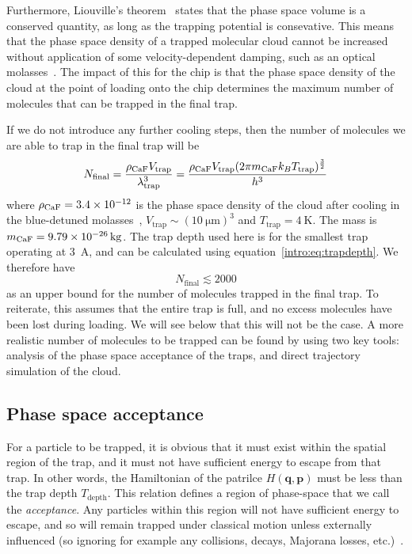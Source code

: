 Furthermore, Liouville's theorem~\cite{Landau1982, Hand1998} states that the
phase space volume is a conserved quantity, as long as the trapping potential
is consevative. This means that the phase space density of a trapped molecular
cloud cannot be increased without application of some velocity-dependent
damping, such as an optical molasses~\cite{Metcalf1999}. The impact of this for
the chip is that the phase space density of the cloud at the point of loading
onto the chip determines the maximum number of molecules that can be trapped in
the final trap.

If we do not introduce any further cooling steps, then the number of molecules
we are able to trap in the final trap will be
%
\begin{equation}
  N_\text{final} = \frac{\rho_\text{CaF{}}V_\text{trap}}
  {\lambda_\text{trap}^3} = \frac{\rho_\text{CaF{}} V_\text{trap}(2 \pi m_\text{CaF} k_B
  T_\text{trap})^\frac{3}{2}}{h^3}
  \label{design:eq:psd_N}
\end{equation}
%
where $\rho_\text{CaF{}} = 3.4\times10^{-12}$ is the phase space density of
the \CaF{} cloud after cooling in the blue-detuned molasses~\cite{Truppe2017},
$V_\text{trap}\sim(\SI{10}{\micro\meter})^3$ and
$T_\text{trap}=\SI{4}{\kelvin}$. The \CaF{} mass is
$m_\text{CaF{}}=\SI{9.79E-26}{\kilogram}$. The trap depth used here is for the
smallest trap operating at \SI{3}{\ampere}, and can be calculated using
equation~\ref{intro:eq:trapdepth}. We therefore have
%
\begin{equation}
  N_\text{final} \lesssim 2000
\end{equation}
%
as an upper bound for the number of molecules trapped in the final trap. To
reiterate, this assumes that the entire trap is full, and no excess molecules
have been lost during loading. We will see below that this will not be the
case. A more realistic number of molecules to be trapped can be found by using
two key tools: analysis of the phase space acceptance of the traps, and direct
trajectory simulation of the cloud.

\subsection{Phase space acceptance}



For a particle to be trapped, it is obvious that it must exist within the
spatial region of the trap, and it must not have sufficient energy to escape
from that trap. In other words, the Hamiltonian of the patrilce $H(\mathbf{q},
\mathbf{p})$ must be less than the trap depth $T_\text{depth}$. This relation
defines a region of phase-space that we call the \emph{acceptance}. Any
particles within this region will not have sufficient energy to escape, and so
will remain trapped under classical motion unless externally influenced (so
ignoring for example any collisions, decays, Majorana losses,
etc.)~\cite{Lichtenberg1969}.

